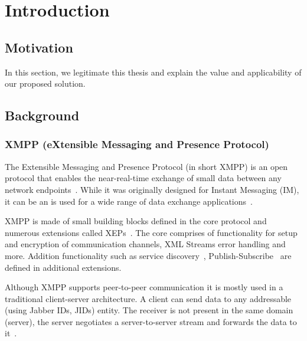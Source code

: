 \chapter{Introduction}
\label{sec:introduction}

\section{Motivation}
In this section, we legitimate this thesis and explain the value and applicability of our proposed solution.

\section{Background}


\subsection{XMPP (eXtensible Messaging and Presence Protocol)}
The Extensible Messaging and Presence Protocol (in short XMPP) is an open protocol that enables the near-real-time exchange of small data between any network endpoints~\cite{rfc6120}. While it was originally designed for Instant Messaging (IM), it can be an is used for a wide range of data exchange applications~\cite{ieee-xplore-stream-xml-xmpp}.


XMPP is made of small building blocks defined in the core protocol\cite{rfc6120} and numerous extensions called XEPs~\cite{xep-0001}. The core comprises of functionality for setup and encryption of communication channels, XML Streams error handling and more. Addition functionality such as service discovery~\cite{xep-0030}, Publish-Subscribe~\cite{xep-0060} are defined in additional extensions.

Although XMPP supports peer-to-peer communication it is mostly used in a traditional client-server architecture. A client can send data to any addressable (using Jabber IDs, JIDs) entity. The receiver is not present in the same domain (server), the server negotiates a server-to-server stream and forwards the data to it~\cite{rfc6120}.

